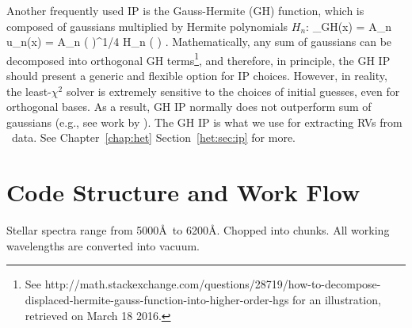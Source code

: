 Another frequently used IP is the Gauss-Hermite (GH)
function, which is composed of gaussians multiplied by Hermite
polynomials $H_n$:
\beq
\curlyp_{\rm GH}(x) = \sum A_n u_n(x) = \sum A_n 
\left(  \right)^{1/4}  H_n
\left(  \right) .
\eeq
Mathematically, any sum of gaussians can be decomposed into orthogonal
GH terms\footnote{See
  http://math.stackexchange.com/questions/28719/how-to-decompose-displaced-hermite-gauss-function-into-higher-order-hgs
  for an illustration, retrieved on March 18 2016.}, and therefore, in
principle, the GH IP should present a generic and flexible option for
IP choices. However, in reality, the least-$\chi^2$ solver is
extremely sensitive to the choices of initial guesses, even for
orthogonal bases. As a result, GH IP normally does not outperform sum
of gaussians (e.g., see work by \citealt{2013AAS...22114908V}). The GH
IP is what we use for extracting RVs from \het\ data. See
Chapter~\ref{chap:het} Section~\ref{het:sec:ip} for more.




\section{Code Structure and Work Flow}

Stellar spectra range from 5000\AA\ to 6200\AA. Chopped into
chunks. All working wavelengths are converted into vacuum. 


